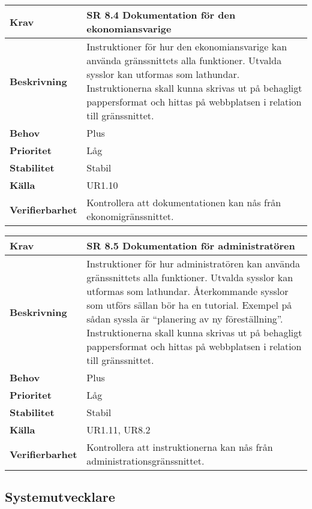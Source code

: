 \documentclass[a4paper, twoside, 11pt, titlepage]{article}
\begin{document}
	\begin{tabular} { p{2.6cm} p{12.5cm} }
		\hline
		\sffamily\textbf{Krav} & \sffamily\textbf{SR 8.4 Dokumentation för den ekonomiansvarige } \\
		\hline
		\sffamily\textbf{Beskrivning} & Instruktioner för hur den ekonomiansvarige kan använda gränssnittets alla funktioner. Utvalda sysslor kan utformas som lathundar. Instruktionerna skall kunna skrivas ut på behagligt pappersformat och hittas på webbplatsen i relation till gränssnittet.  \\
		\hline
		\sffamily\textbf{Behov} & Plus  \\
		\hline
		\sffamily\textbf{Prioritet} & Låg  \\
		\hline
		\sffamily\textbf{Stabilitet} & Stabil  \\
		\hline
		\sffamily\textbf{Källa} & UR1.10  \\
		\hline
		\sffamily\textbf{Verifierbarhet} & Kontrollera att dokumentationen kan nås från ekonomigränssnittet.  \\
		\hline
	\end{tabular}
	\vspace{6mm}

	\begin{tabular} { p{2.6cm} p{12.5cm} }
		\hline
		\sffamily\textbf{Krav} & \sffamily\textbf{SR 8.5 Dokumentation för administratören } \\
		\hline
		\sffamily\textbf{Beskrivning} & Instruktioner för hur administratören kan använda gränssnittets alla funktioner. Utvalda sysslor kan utformas som lathundar. Återkommande sysslor som utförs sällan bör ha en tutorial. Exempel på sådan syssla är ``planering av ny föreställning''. Instruktionerna skall kunna skrivas ut på behagligt pappersformat och hittas på webbplatsen i relation till gränssnittet.  \\
		\hline
		\sffamily\textbf{Behov} & Plus  \\
		\hline
		\sffamily\textbf{Prioritet} & Låg  \\
		\hline
		\sffamily\textbf{Stabilitet} & Stabil  \\
		\hline
		\sffamily\textbf{Källa} & UR1.11, UR8.2  \\
		\hline
		\sffamily\textbf{Verifierbarhet} & Kontrollera att instruktionerna kan nås från administrationsgränssnittet.  \\
		\hline
	\end{tabular}


	\subsection{Systemutvecklare}
\end{document}
